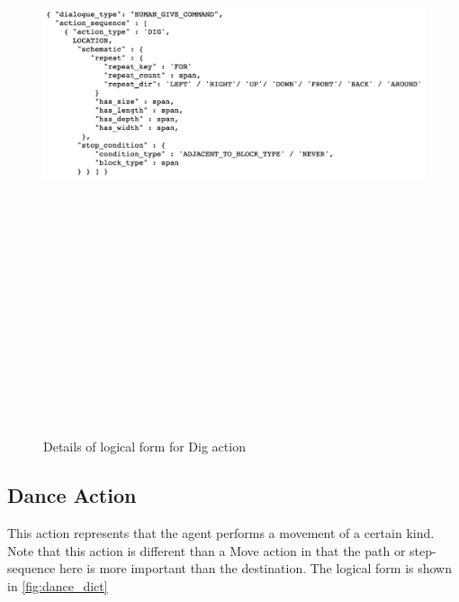 \begin{figure}[h]
    \centering
    \includegraphics[width=15cm,height=20cm,keepaspectratio]{figures/dig.png}
    \caption{Details of logical form for Dig action}
    \label{fig:dig_dict}
\end{figure}

\subsection{Dance Action}
This action represents that the agent performs a movement of a certain kind. Note that this action is different than a Move action in that the path or step-sequence here is more important than the destination. The logical form is shown in \ref{fig:dance_dict}

